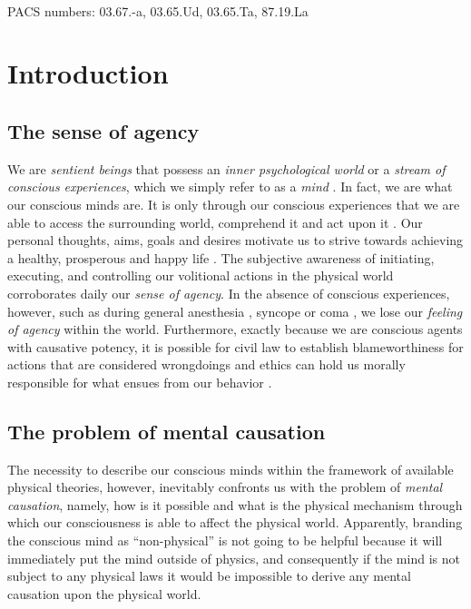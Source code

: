 \documentclass{ws-ijmpb}
\begin{document}

~

{PACS numbers: 03.67.-a, 03.65.Ud, 03.65.Ta, 87.19.La}

\newpage
\tableofcontents

\newpage
\section{Introduction}

\subsection{The sense of agency}

We are \emph{sentient beings} that possess an \emph{inner psychological world} or a \emph{stream of conscious experiences}, which we simply refer to as a \emph{mind} \cite{James1890,McGilvary1907,Nagel1974}.
In fact, we are what our conscious minds are.
It is only through our conscious experiences that we are able to access the surrounding world, comprehend it and act upon it \cite{Georgiev2017}.
Our personal thoughts, aims, goals and desires motivate us to strive towards achieving a healthy, prosperous and happy life \cite{Peterson2005}.
The subjective awareness of initiating, executing, and controlling our volitional actions in the physical world corroborates daily our \emph{sense of agency}.
In the absence of conscious experiences, however, such as during general anesthesia \cite{Rudolph2004,Franks2008,Brown2011},
syncope \cite{Kapoor2000} or coma \cite{Brown2010}, we lose our
\emph{feeling of agency} within the world. Furthermore, exactly because we
are conscious agents with causative potency, it is possible for civil
law to establish blameworthiness for actions that are considered wrongdoings
\cite{Fagelson1979,Jaffey1985,Hopkins2005} and ethics can hold us
morally responsible for what ensues from our behavior \cite{Sartre2007,Shafer2020}.

\subsection{The problem of mental causation}

The necessity to describe our conscious minds within the framework
of available physical theories, however, inevitably confronts us with
the problem of \emph{mental causation}, namely, how is it possible
and what is the physical mechanism through which our consciousness
is able to affect the physical world. Apparently, branding the conscious
mind as ``non-physical'' is not going to be helpful because
it will immediately put the mind outside of physics, and consequently
if the mind is not subject to any physical laws it would be impossible
to derive any mental causation upon the physical world.
\end{document}
